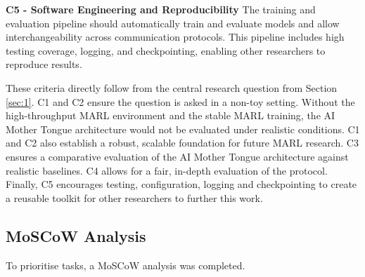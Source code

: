 \textbf{C5 - Software Engineering and Reproducibility}
The training and evaluation pipeline should automatically train and evaluate models and allow interchangeability across communication protocols.
This pipeline includes high testing coverage, logging, and checkpointing, enabling other researchers to reproduce results.

These criteria directly follow from the central research question from Section \ref{sec:1}.
C1 and C2 ensure the question is asked in a non-toy setting.
Without the high-throughput MARL environment and the stable MARL training, the AI Mother Tongue architecture \cite{AIMotherTongue} would not be evaluated under realistic conditions.
C1 and C2 also establish a robust, scalable foundation for future MARL research.
C3 ensures a comparative evaluation of the AI Mother Tongue architecture against realistic baselines.
C4 allows for a fair, in-depth evaluation of the protocol.
Finally, C5 encourages testing, configuration, logging and checkpointing to create a reusable toolkit for other researchers to further this work.

\subsection{MoSCoW Analysis}
\label{sec:2.5.3}

To prioritise tasks, a MoSCoW analysis was completed.

